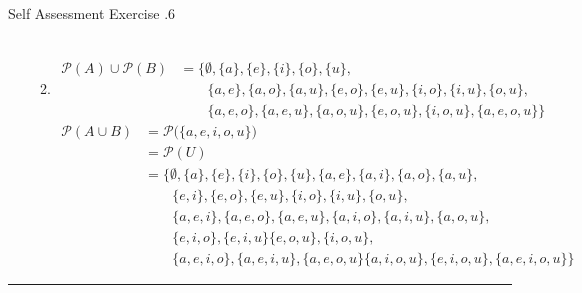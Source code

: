 \documentclass[../notes.tex]{subfiles}
\begin{document}
\begin{exercise}{Self Assessment Exercise \thechapter.6}
\begin{enumerate}
\begin{enumerate}[label=(\alph*)]
\begin{align*}
                \end{align*}
              \item \rule{0pt}{11pt} \vspace*{-25pt}
                \begin{align*}
                  \mathcal{P}(A) \cup \mathcal{P}(B) &= \bigl\{\emptyset, \{a\}, \{e\}, \{i\}, \{o\}, \{u\},\\
                  & \qquad \{a, e\}, \{a, o\}, \{a, u\}, \{e, o\}, \{e, u\}, \{i, o\}, \{i, u\}, \{o, u\}, \\
                  & \qquad \{a, e, o\}, \{a, e, u\}, \{a, o, u\}, \{e, o, u\}, \{i, o, u\}, \{a, e, o, u\}\bigr\}
                \end{align*}
                \begin{align*}
                  \mathcal{P}(A \cup B) &= \mathcal{P}\bigl(\{a, e, i, o, u\}\bigr)\\
                  &= \mathcal{P}(U)\\
                  &= \bigl\{\emptyset, \{a\}, \{e\}, \{i\}, \{o\}, \{u\}, \{a, e\}, \{a, i\}, \{a, o\}, \{a, u\},\\
                  & \qquad \{e, i\}, \{e, o\}, \{e, u\}, \{i, o\}, \{i, u\}, \{o, u\},\\
                  & \qquad \{a, e, i\}, \{a, e, o\}, \{a, e, u\}, \{a, i, o\}, \{a, i, u\}, \{a, o, u\},\\
                  & \qquad \{e, i, o\}, \{e, i, u\} \{e, o, u\}, \{i, o, u\},\\
                  & \qquad \{a, e, i, o\}, \{a, e, i, u\}, \{a, e, o, u\} \{a, i, o, u\}, \{e, i, o, u\}, \{a, e, i, o, u\}\bigr\}
                \end{align*}
            \end{enumerate}
        \end{enumerate}
      \end{exercise}
      \noindent\rule{\textwidth}{0.4pt}
\end{document}
